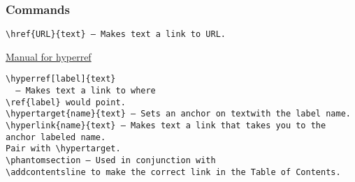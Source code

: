 \documentclass[class=book , crop=false]{standalone}
\begin{document}
\subsubsection{\Large Commands}
\begin{verbatim}
\href{URL}{text} — Makes text a link to URL.
\end{verbatim}
\href{../../../../../documentation/references/hyperrefmanual.pdf}{Manual for hyperref}

\begin{verbatim}
\hyperref[label]{text} 
  — Makes text a link to where
\ref{label} would point.
\hypertarget{name}{text} — Sets an anchor on textwith the label name. 
\hyperlink{name}{text} — Makes text a link that takes you to the anchor labeled name. 
Pair with \hypertarget. 
\phantomsection — Used in conjunction with
\addcontentsline to make the correct link in the Table of Contents.
\end{verbatim}				
\end{document}
